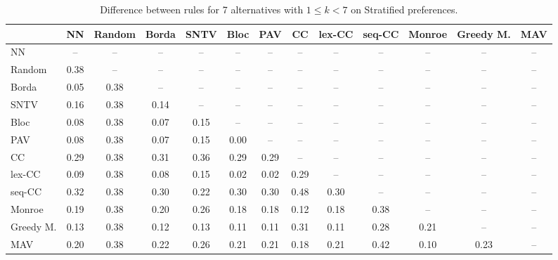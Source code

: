 
\begin{table*}[htbp]
\centering
\begin{tabular}{lcccccccccccc}
\toprule
 & NN & Random & Borda & SNTV & Bloc & PAV & CC & lex-CC & seq-CC & Monroe & Greedy M. & MAV \\
\midrule
NN & -- & -- & -- & -- & -- & -- & -- & -- & -- & -- & -- & -- \\
Random & \cellcolor{blue!38} 0.38 & -- & -- & -- & -- & -- & -- & -- & -- & -- & -- & -- \\
Borda & \cellcolor{blue!5} 0.05 & \cellcolor{blue!38} 0.38 & -- & -- & -- & -- & -- & -- & -- & -- & -- & -- \\
SNTV & \cellcolor{blue!16} 0.16 & \cellcolor{blue!38} 0.38 & \cellcolor{blue!14} 0.14 & -- & -- & -- & -- & -- & -- & -- & -- & -- \\
Bloc & \cellcolor{blue!8} 0.08 & \cellcolor{blue!38} 0.38 & \cellcolor{blue!7} 0.07 & \cellcolor{blue!15} 0.15 & -- & -- & -- & -- & -- & -- & -- & -- \\
PAV & \cellcolor{blue!8} 0.08 & \cellcolor{blue!38} 0.38 & \cellcolor{blue!7} 0.07 & \cellcolor{blue!15} 0.15 & \cellcolor{blue!0} 0.00 & -- & -- & -- & -- & -- & -- & -- \\
CC & \cellcolor{blue!28} 0.29 & \cellcolor{blue!38} 0.38 & \cellcolor{blue!31} 0.31 & \cellcolor{blue!36} 0.36 & \cellcolor{blue!28} 0.29 & \cellcolor{blue!28} 0.29 & -- & -- & -- & -- & -- & -- \\
lex-CC & \cellcolor{blue!9} 0.09 & \cellcolor{blue!38} 0.38 & \cellcolor{blue!8} 0.08 & \cellcolor{blue!15} 0.15 & \cellcolor{blue!2} 0.02 & \cellcolor{blue!2} 0.02 & \cellcolor{blue!28} 0.29 & -- & -- & -- & -- & -- \\
seq-CC & \cellcolor{blue!32} 0.32 & \cellcolor{blue!38} 0.38 & \cellcolor{blue!30} 0.30 & \cellcolor{blue!22} 0.22 & \cellcolor{blue!30} 0.30 & \cellcolor{blue!30} 0.30 & \cellcolor{blue!48} 0.48 & \cellcolor{blue!30} 0.30 & -- & -- & -- & -- \\
Monroe & \cellcolor{blue!19} 0.19 & \cellcolor{blue!38} 0.38 & \cellcolor{blue!20} 0.20 & \cellcolor{blue!26} 0.26 & \cellcolor{blue!18} 0.18 & \cellcolor{blue!18} 0.18 & \cellcolor{blue!12} 0.12 & \cellcolor{blue!18} 0.18 & \cellcolor{blue!38} 0.38 & -- & -- & -- \\
Greedy M. & \cellcolor{blue!13} 0.13 & \cellcolor{blue!38} 0.38 & \cellcolor{blue!12} 0.12 & \cellcolor{blue!13} 0.13 & \cellcolor{blue!11} 0.11 & \cellcolor{blue!11} 0.11 & \cellcolor{blue!31} 0.31 & \cellcolor{blue!11} 0.11 & \cellcolor{blue!28} 0.28 & \cellcolor{blue!21} 0.21 & -- & -- \\
MAV & \cellcolor{blue!20} 0.20 & \cellcolor{blue!38} 0.38 & \cellcolor{blue!22} 0.22 & \cellcolor{blue!26} 0.26 & \cellcolor{blue!21} 0.21 & \cellcolor{blue!21} 0.21 & \cellcolor{blue!18} 0.18 & \cellcolor{blue!21} 0.21 & \cellcolor{blue!42} 0.42 & \cellcolor{blue!10} 0.10 & \cellcolor{blue!23} 0.23 & -- \\
\bottomrule
\end{tabular}

\caption{Difference between rules for 7 alternatives with $1 \leq k < 7$ on Stratified preferences.}
\label{tab:rule_distance_heatmap-m=[7]-pref_dist=stratification__args__weight=0.5}
\end{table*}
    